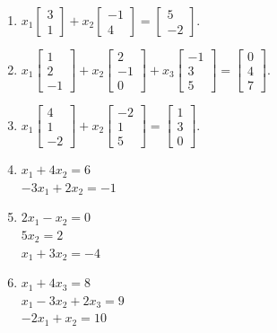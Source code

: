 \documentclass[12pt]{article}
\begin{document}
\begin{enumerate}
    \item $x_1 \begin{bmatrix} 3 \\ 1 \end{bmatrix} + x_2 \begin{bmatrix} -1 \\ 4 \end{bmatrix} = \begin{bmatrix} 5 \\ -2 \end{bmatrix}$.
    \item $x_1 \begin{bmatrix} 1 \\ 2 \\ -1 \end{bmatrix} + x_2 \begin{bmatrix} 2 \\ -1 \\ 0 \end{bmatrix} + x_3 \begin{bmatrix} -1 \\ 3 \\ 5 \end{bmatrix} = \begin{bmatrix} 0 \\ 4 \\ 7 \end{bmatrix}$.
    \item $x_1 \begin{bmatrix} 4 \\ 1 \\ -2 \end{bmatrix} + x_2 \begin{bmatrix} -2 \\ 1 \\ 5 \end{bmatrix} = \begin{bmatrix} 1 \\ 3 \\ 0 \end{bmatrix}$.
    
    \item $x_1 + 4x_2 = 6$ \\ $-3x_1 + 2x_2 = -1$
    \item $2x_1 - x_2 = 0$ \\ $5x_2 = 2$ \\ $x_1 + 3x_2 = -4$
    \item $x_1 + 4x_3 = 8$ \\ $x_1 - 3x_2 + 2x_3 = 9$ \\ $-2x_1 + x_2 = 10$


\end{enumerate}
\end{document}
